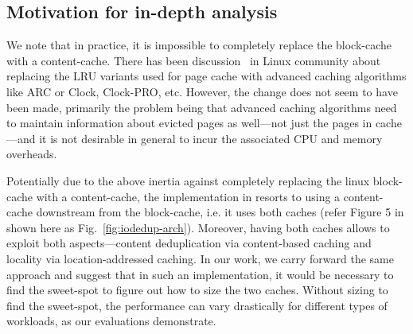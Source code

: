 \subsection{Motivation for in-depth analysis}
We note that in practice, it is impossible to completely replace the
block-cache with a content-cache. 
There has been discussion~\cite{advanced-page-replacement-algo} in Linux 
community about replacing the LRU variants used for page cache with 
advanced caching algorithms like ARC or Clock, Clock-PRO, etc. 
However, the change does not seem to have been made, primarily the problem 
being that advanced caching algorithms need to maintain information about 
evicted pages as well---not just the pages in cache---and it is not 
desirable in general to incur the associated CPU and memory overheads. 

Potentially due to the above inertia against completely replacing the 
linux block-cache with a content-cache, the implementation in \cite{iodedup} 
resorts to using a content-cache downstream from the block-cache, i.e. it 
uses both caches (refer Figure 5 in \cite{iodedup}
shown here as Fig.~\ref{fig:iodedup-arch}). 
Moreover, having both caches allows to exploit both 
aspects---content deduplication via content-based caching and locality 
via location-addressed caching. In our work, we carry forward the same 
approach and suggest that in such an implementation, it would be 
necessary to find the sweet-spot to figure out how to size the two 
caches. Without sizing to find the sweet-spot, the performance can 
vary drastically for different types of workloads, as our evaluations
demonstrate.

